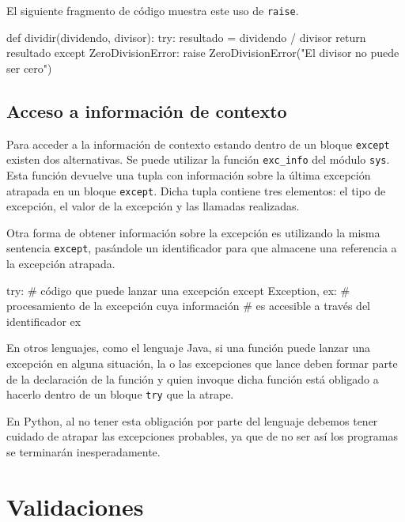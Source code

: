 El siguiente fragmento de código muestra este uso de \lstinline!raise!.

\begin{codigo-python-sn}
def dividir(dividendo, divisor):
	try:
		resultado = dividendo / divisor
		return resultado
	except ZeroDivisionError:
		raise ZeroDivisionError("El divisor no puede ser cero")
\end{codigo-python-sn}

\subsection{Acceso a información de contexto}

Para acceder a la información de contexto estando dentro de un bloque
\lstinline!except!  existen dos alternativas. Se puede utilizar la función
\lstinline!exc_info!  del módulo \lstinline!sys!. Esta función devuelve una
tupla con información sobre la última excepción atrapada en un bloque
\lstinline!except!. Dicha tupla contiene tres elementos: el tipo de
excepción, el valor de la excepción y las llamadas realizadas.

Otra forma de obtener información sobre la excepción es utilizando la
misma sentencia \lstinline!except!, pasándole un identificador para que
almacene una referencia a la excepción atrapada.

\begin{codigo-python-sn}
try:
	# código que puede lanzar una excepción
except Exception, ex:
	# procesamiento de la excepción cuya información
	# es accesible a través del identificador ex
\end{codigo-python-sn}


\begin{sabias_que}
En otros lenguajes, como el lenguaje Java, si una función puede lanzar una
excepción en alguna situación, la o las excepciones que lance deben formar
parte de la declaración de la función y quien invoque dicha función está
obligado a hacerlo dentro de un bloque \lstinline!try! que la atrape.

En Python, al no tener esta obligación por parte del lenguaje debemos tener
cuidado de atrapar las excepciones probables, ya que de no ser así los
programas se terminarán inesperadamente.
\end{sabias_que}

\section{Validaciones}

